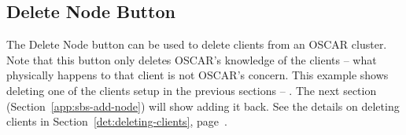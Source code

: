 
\subsection{Delete Node Button}
\label{app:sbs-delete-node}

The Delete Node button can be used to delete clients from an OSCAR
cluster.  Note that this button only deletes OSCAR's knowledge of the
clients -- what physically happens to that client is not OSCAR's
concern.  This example shows deleting one of the clients setup in the
previous sections -- .  The next section
(Section~\ref{app:sbs-add-node}) will show adding it back.  See the
details on deleting clients in Section~\ref{det:deleting-clients},
page~\pageref{det:deleting-clients}.

